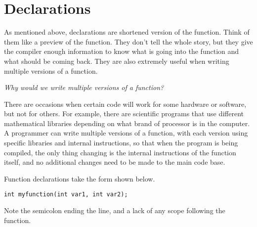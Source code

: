 \section{Declarations}
As mentioned above, declarations are shortened version of the function.  Think of them like a preview of the function.  They don't tell the whole story, but they give the compiler enough information to know what is going into the function and what should be coming back.  They are also extremely useful when writing multiple versions of a function.

\textit{Why would we write multiple versions of a function?}

There are occasions when certain code will work for some hardware or software, but not for others.  For example, there are scientific programs that use different mathematical libraries depending on what brand of processor is in the computer.  A programmer can write multiple versions of a function, with each version using specific libraries and internal instructions, so that when the program is being compiled, the only thing changing is the internal instructions of the function itself, and no additional changes need to be made to the main code base.

Function declarations take the form shown below.

\begin{verbatim}
int myfunction(int var1, int var2);
\end{verbatim}

Note the semicolon ending the line, and a lack of any scope following the function.
